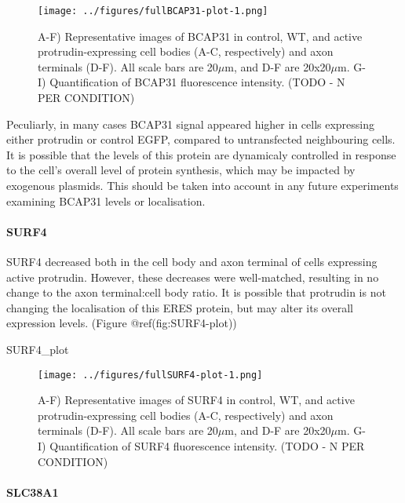 \documentclass[
  12pt,
  a4paper,
]{article}
\newenvironment{Shaded}{\begin{snugshade}}{\end{snugshade}}
\newcommand{\NormalTok}[1]{#1}
\begin{document}
\begin{figure}
\centering
\texttt{[image: ../figures/fullBCAP31-plot-1.png]}
\caption{A-F) Representative images of BCAP31 in control, WT, and active
protrudin-expressing cell bodies (A-C, respectively) and axon terminals
(D-F). All scale bars are 20\(\mu\)m, and D-F are 20x20\(\mu\)m. G-I)
Quantification of BCAP31 fluorescence intensity. (TODO - N PER
CONDITION)}
\end{figure}

Peculiarly, in many cases BCAP31 signal appeared higher in cells
expressing either protrudin or control EGFP, compared to untransfected
neighbouring cells. It is possible that the levels of this protein are
dynamicaly controlled in response to the cell's overall level of protein
synthesis, which may be impacted by exogenous plasmids. This should be
taken into account in any future experiments examining BCAP31 levels or
localisation.

\hypertarget{surf4}{%
\paragraph{SURF4}\label{surf4}}

SURF4 decreased both in the cell body and axon terminal of cells
expressing active protrudin. However, these decreases were well-matched,
resulting in no change to the axon terminal:cell body ratio. It is
possible that protrudin is not changing the localisation of this ERES
protein, but may alter its overall expression levels. (Figure
@ref(fig:SURF4-plot))

\begin{Shaded}
\begin{Highlighting}[]
\NormalTok{SURF4\_plot}
\end{Highlighting}
\end{Shaded}

\begin{figure}
\centering
\texttt{[image: ../figures/fullSURF4-plot-1.png]}
\caption{A-F) Representative images of SURF4 in control, WT, and active
protrudin-expressing cell bodies (A-C, respectively) and axon terminals
(D-F). All scale bars are 20\(\mu\)m, and D-F are 20x20\(\mu\)m. G-I)
Quantification of SURF4 fluorescence intensity. (TODO - N PER
CONDITION)}
\end{figure}

\hypertarget{slc38a1}{%
\paragraph{SLC38A1}\label{slc38a1}}
\end{document}
